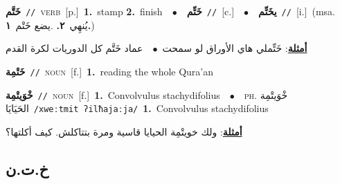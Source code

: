 \documentclass[10pt,a4paper,twoside]{article} %
\begin{document}
\begin{multicols}{2}
{\setlength\topsep{0pt}\textbf{\foreignlanguage{arabic}{خَتَّم}}\ {\color{gray}\texttt{//}\color{black}}\ \textsc{verb}\ [p.]\ \textbf{1.}~stamp  \textbf{2.}~finish\ \ $\bullet$\ \ \setlength\topsep{0pt}\textbf{\foreignlanguage{arabic}{خَتِّم}}\ {\color{gray}\texttt{//}\color{black}}\ [c.]\ \ $\bullet$\ \ \setlength\topsep{0pt}\textbf{\foreignlanguage{arabic}{يخَتِّم}}\ {\color{gray}\texttt{//}\color{black}}\ [i.]\ \color{gray}(msa. \foreignlanguage{arabic}{يُنهِي}~\foreignlanguage{arabic}{\textbf{٢.}}  .\foreignlanguage{arabic}{يضع خَتْم}~\foreignlanguage{arabic}{\textbf{١.}})\color{black}\  \begin{flushright}\color{gray}\foreignlanguage{arabic}{\textbf{\underline{\foreignlanguage{arabic}{أمثلة}}}: خَتِّملي هاي الأوراق لو سمحت\ $\bullet$\ \  عماد خَتَّم كل الدوريات لكرة القدم}\end{flushright}\color{black}} \vspace{2mm}

{\setlength\topsep{0pt}\textbf{\foreignlanguage{arabic}{خَتْمِة}}\ {\color{gray}\texttt{//}\color{black}}\ \textsc{noun}\ [f.]\ \textbf{1.}~reading the whole Qura'an\ } \vspace{2mm}

{\setlength\topsep{0pt}\textbf{\foreignlanguage{arabic}{خْوَيتْمِة}}\ {\color{gray}\texttt{//}\color{black}}\ \textsc{noun}\ [f.]\ \textbf{1.}~Convolvulus stachydifolius\ \ $\bullet$\ \ \textsc{ph.} \color{gray} \foreignlanguage{arabic}{خْوَيتْمِة الحَيَايَا}\color{black}\ {\color{gray}\texttt{/{\sffamily xweːtmit ʔilħajaːja}/}\color{black}}\ \textbf{1.}~Convolvulus stachydifolius\  \begin{flushright}\color{gray}\foreignlanguage{arabic}{\textbf{\underline{\foreignlanguage{arabic}{أمثلة}}}: ولك خويتْمِة الحيايا قاسية ومرة بتتاكلش. كيف أكلتها؟}\end{flushright}\color{black}} \vspace{2mm}

\vspace{-3mm}
\subsection*{\color{blue}\foreignlanguage{arabic}{خ.ت.ن}\color{blue}{}} 


\end{multicols}
\end{document}
